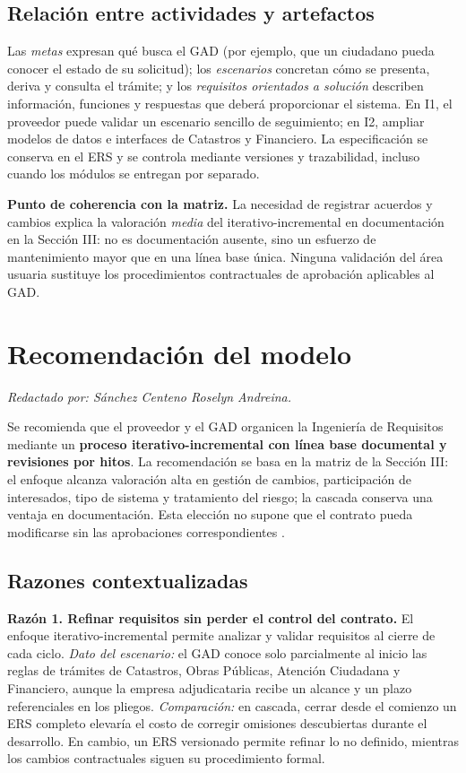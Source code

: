 \documentclass[conference,onecolumn]{IEEEtran}
\begin{document}
\subsection{Relación entre actividades y artefactos}

Las \emph{metas} expresan qué busca el GAD (por ejemplo, que un ciudadano pueda conocer el estado de su solicitud); los \emph{escenarios} concretan cómo se presenta, deriva y consulta el trámite; y los \emph{requisitos orientados a solución} describen información, funciones y respuestas que deberá proporcionar el sistema. En I1, el proveedor puede validar un escenario sencillo de seguimiento; en I2, ampliar modelos de datos e interfaces de Catastros y Financiero. La especificación se conserva en el ERS y se controla mediante versiones y trazabilidad, incluso cuando los módulos se entregan por separado.

\noindent\textbf{Punto de coherencia con la matriz.} La necesidad de registrar acuerdos y cambios explica la valoración \emph{media} del iterativo-incremental en documentación en la Sección III: no es documentación ausente, sino un esfuerzo de mantenimiento mayor que en una línea base única. Ninguna validación del área usuaria sustituye los procedimientos contractuales de aprobación aplicables al GAD.

\section{Recomendación del modelo}
\noindent\textit{Redactado por: Sánchez Centeno Roselyn Andreina.}\par\smallskip


Se recomienda que el proveedor y el GAD organicen la Ingeniería de Requisitos mediante un \textbf{proceso iterativo-incremental con línea base documental y revisiones por hitos}. La recomendación se basa en la matriz de la Sección III: el enfoque alcanza valoración alta en gestión de cambios, participación de interesados, tipo de sistema y tratamiento del riesgo; la cascada conserva una ventaja en documentación. Esta elección no supone que el contrato pueda modificarse sin las aprobaciones correspondientes \cite{pohl2025,washizaki2024,buhne2026}.

\subsection{Razones contextualizadas}

\noindent\textbf{Razón 1. Refinar requisitos sin perder el control del contrato.} El enfoque iterativo-incremental permite analizar y validar requisitos al cierre de cada ciclo. \emph{Dato del escenario:} el GAD conoce solo parcialmente al inicio las reglas de trámites de Catastros, Obras Públicas, Atención Ciudadana y Financiero, aunque la empresa adjudicataria recibe un alcance y un plazo referenciales en los pliegos. \emph{Comparación:} en cascada, cerrar desde el comienzo un ERS completo elevaría el costo de corregir omisiones descubiertas durante el desarrollo. En cambio, un ERS versionado permite refinar lo no definido, mientras los cambios contractuales siguen su procedimiento formal.
\end{document}

